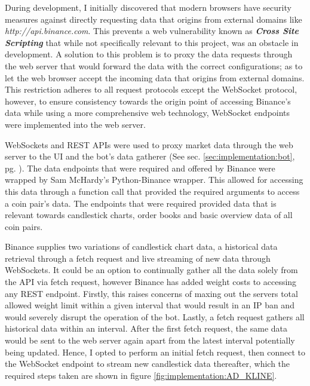 \noindent During development, I initially discovered that modern browsers have security measures against directly requesting data that origins from external domains like \textit{http://api.binance.com}. This prevents a web vulnerability known as \textit{\textbf{Cross Site Scripting}} that while not specifically relevant to this project, was an obstacle in development. A solution to this problem is to proxy the data requests through the web server that would forward the data with the correct configurations; as to let the web browser accept the incoming data that origins from external domains. This restriction adheres to all request protocols except the WebSocket protocol, however, to ensure consistency towards the origin point of accessing Binance's data while using a more comprehensive web technology, WebSocket endpoints were implemented into the web server.

WebSockets and REST APIs were used to proxy market data through the web server to the UI and the bot's data gatherer (See sec. \ref{sec:implementation:bot}, pg. \pageref{sec:implementation:bot}). The data endpoints that were required and offered by Binance were wrapped by Sam McHardy's \cite{MISC:Python-Binance} Python-Binance wrapper. This allowed for accessing this data through a function call that provided the required arguments to access a coin pair's data. The endpoints that were required provided data that is relevant towards candlestick charts, order books and basic overview data of all coin pairs.

Binance supplies two variations of candlestick chart data, a historical data retrieval through a fetch request and live streaming of new data through WebSockets. It could be an option to continually gather all the data solely from the API via fetch request, however Binance has added weight costs to accessing any REST endpoint. Firstly, this raises concerns of maxing out the servers total allowed weight limit within a given interval that would result in an IP ban and would severely disrupt the operation of the bot. Lastly, a fetch request gathers all historical data within an interval. After the first fetch request, the same data would be sent to the web server again apart from the latest interval potentially being updated. Hence, I opted to perform an initial fetch request, then connect to the WebSocket endpoint to stream new candlestick data thereafter, which the required steps taken are shown in figure \ref{fig:implementation:AD_KLINE}. 

